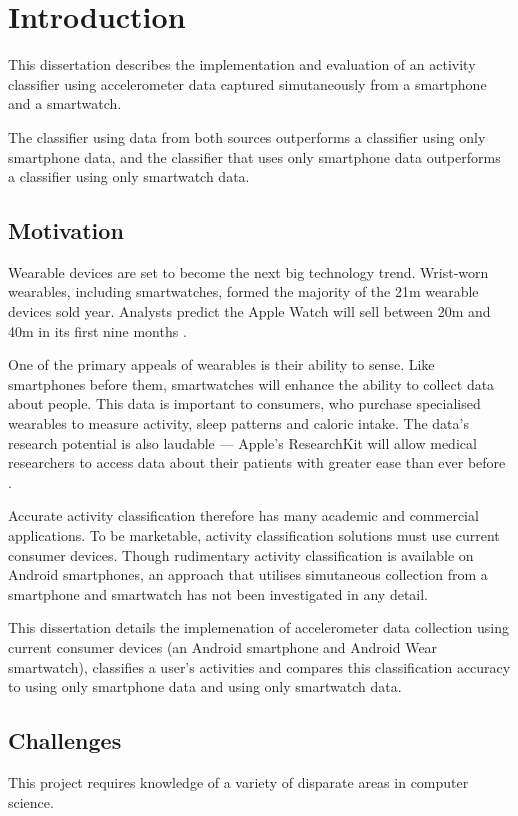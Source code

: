 \chapter{Introduction}
  This dissertation describes the implementation and evaluation of an activity classifier using 
  accelerometer data captured simutaneously from a smartphone and a smartwatch.  
  
  The classifier using data from both sources outperforms a classifier using only smartphone data,
  and the classifier that uses only smartphone data outperforms a classifier using only smartwatch 
  data.
  \section{Motivation}
  \label{sec:intro-motivation}
    Wearable devices are set to become the next big technology trend. Wrist-worn wearables, 
    including smartwatches, formed the majority of the 21m wearable devices sold year. Analysts
    predict the Apple Watch will sell between 20m and 40m in its first nine months 
    \cite{econapplewatch}.
    
    One of the primary appeals of wearables is their ability to sense. Like smartphones before them,
    smartwatches will enhance the ability to collect data about people. This data is important to
    consumers, who purchase specialised wearables to measure activity, sleep patterns and 
    caloric intake. The data's research potential is also laudable --- Apple's ResearchKit will
    allow medical researchers to access data about their patients with greater ease than ever
    before \cite{appleresearchkit}.
        
    Accurate activity classification therefore has many academic and commercial applications. To be
    marketable, activity classification solutions must use current consumer devices. Though 
    rudimentary activity classification is available on Android smartphones, an approach that
    utilises simutaneous collection from a smartphone and smartwatch has not been investigated in
    any detail.
     
    This dissertation details the implemenation of accelerometer data collection using current 
    consumer devices (an Android smartphone and Android Wear smartwatch), classifies a user's 
    activities and compares this classification accuracy to using only smartphone data and using 
    only smartwatch data. 
    
  \section{Challenges}
  \label{sec:intro-challenges}
    This project requires knowledge of a variety of disparate areas in computer science. 
    
